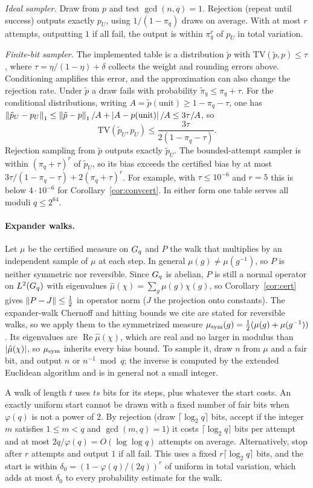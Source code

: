\emph{Ideal sampler.} Draw from $p$ and test $\gcd(n,q)=1$. Rejection (repeat until success) outputs exactly $p_U$, using
$1/(1-\pi_q)$ draws on average. With at most $r$ attempts, outputting $1$ if all fail, the output is within $\pi_q^r$ of $p_U$ in total
variation.

\emph{Finite-bit sampler.} The implemented table is a distribution $\tilde p$ with $\mathrm{TV}(\tilde p,p)\le\tau$, where
$\tau=\eta/(1-\eta)+\delta$ collects the weight and rounding errors above. Conditioning amplifies this error, and the approximation can
also change the rejection rate. Under $\tilde p$ a draw fails with probability $\tilde\pi_q\le\pi_q+\tau$. For the conditional distributions,
writing $A=\tilde p(\text{unit})\ge1-\pi_q-\tau$, one has $\left\lVert \tilde p_U-p_U \right\rVert_1\le\left\lVert \tilde p-p \right\rVert_1/A+\left\lvert A-p(\text{unit}) \right\rvert/A\le3\tau/A$, so
\[
  \mathrm{TV}(\tilde p_U,p_U)\le\frac{3\tau}{2(1-\pi_q-\tau)}.
\]
Rejection sampling from $\tilde p$ outputs exactly $\tilde p_U$. The bounded-attempt sampler is within $(\pi_q+\tau)^r$ of $\tilde p_U$, so its
bias exceeds the certified bias by at most $3\tau/(1-\pi_q-\tau)+2(\pi_q+\tau)^r$. For example, with $\tau\le10^{-6}$ and $r=5$ this is below
$4\cdot10^{-6}$ for Corollary~\ref{cor:convcert}. In either form one table serves all moduli $q\le2^{64}$.

\paragraph{Expander walks.}
Let $\mu$ be the certified measure on $G_q$ and $P$ the walk that multiplies by an independent sample of $\mu$ at each step. In
general $\mu(g)\ne\mu(g^{-1})$, so $P$ is neither symmetric nor reversible. Since $G_q$ is abelian, $P$ is still a normal operator
on $L^2(G_q)$ with eigenvalues $\hat\mu(\chi)=\sum_g\mu(g)\chi(g)$, so Corollary~\ref{cor:cert} gives $\left\lVert P-J \right\rVert\le\frac12$ in operator norm
($J$ the projection onto constants). The expander-walk Chernoff and hitting bounds we cite \cite{hlw2006} are stated for
reversible walks, so we apply them to the symmetrized measure $\mu_{\rm sym}(g)=\frac12(\mu(g)+\mu(g^{-1}))$. Its eigenvalues are
$\operatorname{Re}\hat\mu(\chi)$, which are real and no larger in modulus than $\left\lvert \hat\mu(\chi) \right\rvert$, so $\mu_{\rm sym}$ inherits every bias bound.
To sample it, draw $n$ from $\mu$ and a fair bit, and output $n$ or $n^{-1}\bmod q$; the inverse is computed by the extended
Euclidean algorithm and is in general not a small integer.

A walk of length $t$ uses $ts$ bits for its steps, plus whatever the start costs. An exactly uniform start cannot be drawn with
a fixed number of fair bits when $\varphi(q)$ is not a power of $2$. By rejection (draw $\lceil\log_2q\rceil$ bits, accept if the integer
$m$ satisfies $1\le m<q$ and $\gcd(m,q)=1$) it costs $\lceil\log_2q\rceil$ bits per attempt and at most $2q/\varphi(q)=O(\log\log q)$
attempts on average. Alternatively, stop after $r$ attempts and output $1$ if all fail. This uses a fixed $r\lceil\log_2q\rceil$ bits, and
the start is within $\delta_0=(1-\varphi(q)/(2q))^r$ of uniform in total variation, which adds at most $\delta_0$ to every probability
estimate for the walk.

